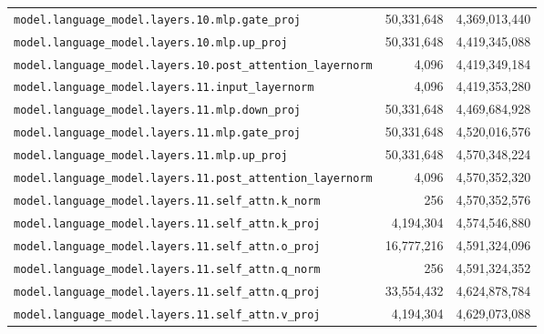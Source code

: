 \documentclass[10pt,a4paper]{article}
\theoremstyle{definition}
\begin{document}
\begin{appendices}
\begin{longtable}{p{9.5cm}rr}
\texttt{model.\allowbreak{}language\_model.\allowbreak{}layers.\allowbreak{}10.\allowbreak{}mlp.\allowbreak{}gate\_proj} & 50,331,648 & 4,369,013,440 \\
\texttt{model.\allowbreak{}language\_model.\allowbreak{}layers.\allowbreak{}10.\allowbreak{}mlp.\allowbreak{}up\_proj} & 50,331,648 & 4,419,345,088 \\
\texttt{model.\allowbreak{}language\_model.\allowbreak{}layers.\allowbreak{}10.\allowbreak{}post\_attention\_layernorm} & 4,096 & 4,419,349,184 \\
\texttt{model.\allowbreak{}language\_model.\allowbreak{}layers.\allowbreak{}11.\allowbreak{}input\_layernorm} & 4,096 & 4,419,353,280 \\
\texttt{model.\allowbreak{}language\_model.\allowbreak{}layers.\allowbreak{}11.\allowbreak{}mlp.\allowbreak{}down\_proj} & 50,331,648 & 4,469,684,928 \\
\texttt{model.\allowbreak{}language\_model.\allowbreak{}layers.\allowbreak{}11.\allowbreak{}mlp.\allowbreak{}gate\_proj} & 50,331,648 & 4,520,016,576 \\
\texttt{model.\allowbreak{}language\_model.\allowbreak{}layers.\allowbreak{}11.\allowbreak{}mlp.\allowbreak{}up\_proj} & 50,331,648 & 4,570,348,224 \\
\texttt{model.\allowbreak{}language\_model.\allowbreak{}layers.\allowbreak{}11.\allowbreak{}post\_attention\_layernorm} & 4,096 & 4,570,352,320 \\
\texttt{model.\allowbreak{}language\_model.\allowbreak{}layers.\allowbreak{}11.\allowbreak{}self\_attn.\allowbreak{}k\_norm} & 256 & 4,570,352,576 \\
\texttt{model.\allowbreak{}language\_model.\allowbreak{}layers.\allowbreak{}11.\allowbreak{}self\_attn.\allowbreak{}k\_proj} & 4,194,304 & 4,574,546,880 \\
\texttt{model.\allowbreak{}language\_model.\allowbreak{}layers.\allowbreak{}11.\allowbreak{}self\_attn.\allowbreak{}o\_proj} & 16,777,216 & 4,591,324,096 \\
\texttt{model.\allowbreak{}language\_model.\allowbreak{}layers.\allowbreak{}11.\allowbreak{}self\_attn.\allowbreak{}q\_norm} & 256 & 4,591,324,352 \\
\texttt{model.\allowbreak{}language\_model.\allowbreak{}layers.\allowbreak{}11.\allowbreak{}self\_attn.\allowbreak{}q\_proj} & 33,554,432 & 4,624,878,784 \\
\texttt{model.\allowbreak{}language\_model.\allowbreak{}layers.\allowbreak{}11.\allowbreak{}self\_attn.\allowbreak{}v\_proj} & 4,194,304 & 4,629,073,088 \\

\end{longtable}
\end{appendices}
\end{document}
